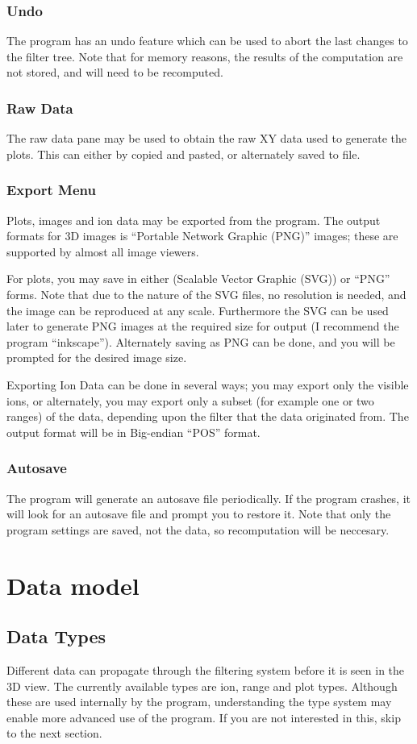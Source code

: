 \documentclass[10pt]{article}
\begin{document}
{\subsubsection{Undo}
 The program has an undo feature which can be used to abort the last changes to the filter tree. Note that for memory reasons, the results of the computation are not stored, and will need to be recomputed.  
\subsubsection{Raw Data}
 The raw data pane may be used to obtain the raw XY data used to generate the plots. This can either by copied and pasted, or alternately saved to file.  
\subsubsection{Export Menu}
 Plots, images and ion data may be exported from the program. The output formats for 3D images is ``Portable Network Graphic (PNG)'' images; these are supported by almost all image viewers. 

For plots, you may save in either (Scalable Vector Graphic (SVG)) or ``PNG'' forms. Note that due to the nature of the SVG files, no resolution is needed, and the image can be reproduced at any scale. Furthermore the SVG can be used later to generate PNG images at the required size for output (I recommend the program ``inkscape''). Alternately saving as PNG can be done, and you will be prompted for the desired image size.

 Exporting Ion Data can be done in several ways; you may export only the visible ions, or alternately, you may export only a subset (for example one or two ranges) of the data, depending upon the filter that the data originated from. The output format will be in Big-endian ``POS'' format.  
\subsubsection{Autosave}
 The program will generate an autosave file periodically. If the program crashes, it will look for an autosave file and prompt you to restore it. Note that only the program settings are saved, not the data, so recomputation will be neccesary.  

\section{Data model}
\subsection{Data Types}
Different data can propagate through the filtering system before it is seen in the 3D view. The currently available types are ion, range and plot types. Although these are used internally by the program, understanding the type system may enable more advanced use of the program. If you are not interested in this, skip to the next section.  

}
\end{document}
